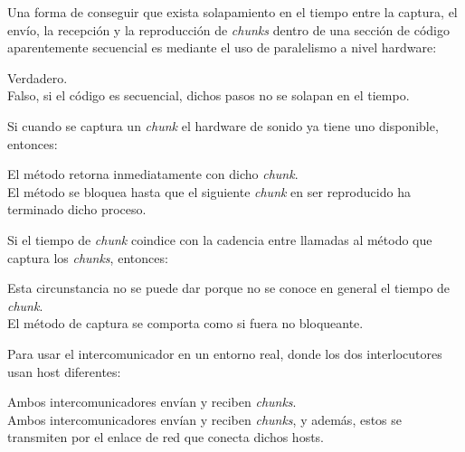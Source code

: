 \documentclass[legalpaper, 12pt, addpoints]{exam}
\begin{document}
\begin{questions}
\vspace{0.10in}

\question Una forma de conseguir que exista solapamiento en el tiempo
entre la captura, el envío, la recepción y la reproducción de
\emph{chunks} dentro de una sección de código aparentemente secuencial
es mediante el uso de paralelismo a nivel hardware:

\begin{oneparchoices}
  \choice Verdadero.\\
  \choice Falso, si el código es secuencial, dichos pasos no se solapan en el tiempo.
\end{oneparchoices}
  
\vspace{0.10in}

\question Si cuando se captura un \emph{chunk} el hardware de sonido ya tiene uno disponible, entonces:

\begin{oneparchoices}
  \choice El método retorna inmediatamente con dicho \emph{chunk}.\\
  \choice El método se bloquea hasta que el siguiente \emph{chunk} en ser reproducido ha terminado dicho proceso.
\end{oneparchoices}
  
\vspace{0.10in}

\question Si el tiempo de \emph{chunk} coindice con la cadencia entre llamadas al método que captura los \emph{chunks}, entonces:

\begin{oneparchoices}
  \choice Esta circunstancia no se puede dar porque no se conoce en general el tiempo de \emph{chunk}.\\
  \choice El método de captura se comporta como si fuera no bloqueante.
\end{oneparchoices}
  
\vspace{0.10in}

\question Para usar el intercomunicador en un entorno real, donde los dos interlocutores usan host diferentes:

\begin{oneparchoices}
  \choice Ambos intercomunicadores envían y reciben \emph{chunks}.\\
  \choice Ambos intercomunicadores envían y reciben \emph{chunks}, y además, estos se transmiten por el enlace de red que conecta dichos hosts.
\end{oneparchoices}
  

\end{questions}
\end{document}
